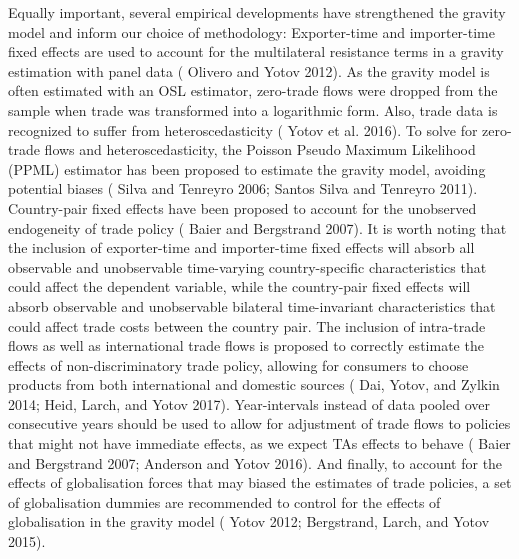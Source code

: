 Equally important, several empirical developments have strengthened the
gravity model and inform our choice of methodology: Exporter-time and
importer-time fixed effects are used to account for the multilateral
resistance terms in a gravity estimation with panel data (\cite{olivero_dynamic_2012} Olivero and
Yotov 2012). As the gravity model is often estimated with an OSL
estimator, zero-trade flows were dropped from the sample when trade was
transformed into a logarithmic form. Also, trade data is recognized to
suffer from heteroscedasticity (\cite{yotov_advanced_2016} Yotov et al. 2016). To solve for
zero-trade flows and heteroscedasticity, the Poisson Pseudo Maximum
Likelihood (PPML) estimator has been proposed to estimate the gravity
model, avoiding potential biases (\cite{silva_log_2006} Silva and Tenreyro 2006; \cite{santos_silva_further_2011} Santos Silva
and Tenreyro 2011). Country-pair fixed effects have been proposed to
account for the unobserved endogeneity of trade policy (\cite{baier_free_2007-1} Baier and
Bergstrand 2007). It is worth noting that the inclusion of
exporter-time and importer-time fixed effects will absorb all observable
and unobservable time-varying country-specific characteristics that
could affect the dependent variable, while the country-pair fixed
effects will absorb observable and unobservable bilateral time-invariant
characteristics that could affect trade costs between the country pair. The inclusion of
intra-trade flows as well as international trade flows is proposed to
correctly estimate the effects of non-discriminatory trade policy,
allowing for consumers to choose products from both international and
domestic sources (\cite{dai_trade-diversion_2014} Dai, Yotov, and Zylkin 2014; \cite{heid_estimating_2017} Heid, Larch, and Yotov
2017). Year-intervals instead of data pooled over consecutive years
should be used to allow for adjustment of trade flows to policies that
might not have immediate effects, as we expect TAs effects to behave (\cite{baier_free_2007-2} Baier and Bergstrand 2007; \cite{anderson_terms_2016-1} Anderson
and Yotov 2016). And finally, to account for the effects of
globalisation forces that may biased the estimates of trade policies, a
set of globalisation dummies are recommended to control for the effects
of globalisation in the gravity model (\cite{yotov_simple_2012} Yotov 2012; \cite{bergstrand_economic_2015} Bergstrand, Larch,
and Yotov 2015).